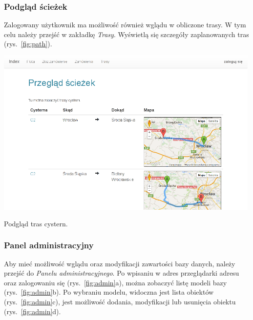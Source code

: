 \documentclass[11pt,a4paper,oneside]{mwart}
\begin{document}
\subsubsection{Podgląd ścieżek}
Zalogowany użytkownik ma możliwość również wglądu w obliczone trasy. W tym celu należy przejść w zakładkę \emph{Trasy}. Wyświetlą się szczegóły zaplanowanych tras (rys.~\ref{fig:path}).
\begin{wykres}[htbp]
  \centering
  \includegraphics[width=0.99\textwidth]{pics/path.png}
  \caption{Podgląd tras cystern.}
  \label{fig:path}
\end{wykres}

\subsubsection{Panel administracyjny}
Aby mieć możliwość wglądu oraz modyfikacji zawartości bazy danych, należy przejść do \emph{Panelu administracyjnego}. Po wpisaniu w adres przeglądarki adresu oraz zalogowaniu się (rys.~\ref{fig:admin}a), można zobaczyć listę modeli bazy (rys.~\ref{fig:admin}b). Po wybraniu modelu, widoczna jest lista obiektów (rys.~\ref{fig:admin}c), jest możliwość dodania, modyfikacji lub usunięcia obiektu (rys.~\ref{fig:admin}d).
\end{document}
